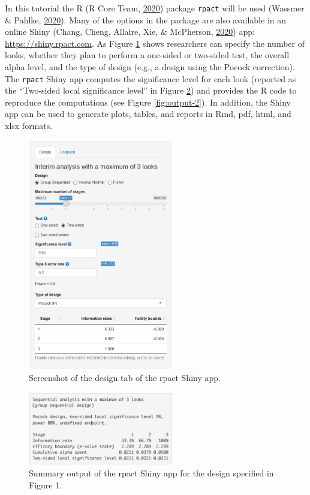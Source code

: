 \documentclass[
  english,
  ,jou, a4paper,floatsintext]{apa6}
\begin{document}
In this tutorial the R (R Core Team, \protect\hyperlink{ref-r_2020}{2020}) package \texttt{rpact} will be used (Wassmer \& Pahlke, \protect\hyperlink{ref-wassmer_rpact_2019}{2020}). Many of the options in the package are also available in an online Shiny (Chang, Cheng, Allaire, Xie, \& McPherson, \protect\hyperlink{ref-shiny_app_2020}{2020}) app: \url{https://shiny.rpact.com}. As Figure \ref{fig:screenshot-1} shows researchers can specify the number of looks, whether they plan to perform a one-sided or two-sided test, the overall alpha level, and the type of design (e.g., a design using the Pocock correction). The \texttt{rpact} Shiny app computes the significance level for each look (reported as the ``Two-sided local significance level'' in Figure \ref{fig:output-1}) and provides the R code to reproduce the computations (see Figure \ref{fig:output-2}). In addition, the Shiny app can be used to generate plots, tables, and reports in Rmd, pdf, html, and xlsx formats.

\begin{figure}
\includegraphics[width=240px]{seq_images/rpact_2} \caption{Screenshot of the design tab of the rpact Shiny app.}\label{fig:screenshot-1}
\end{figure}

\begin{figure}
\includegraphics[width=240px]{seq_images/output_1} \caption{Summary output of the rpact Shiny app for the design specified in Figure 1.}\label{fig:output-1}
\end{figure}
\end{document}
